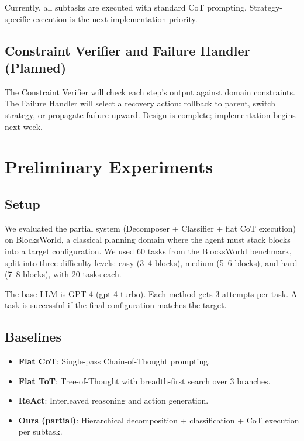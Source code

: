 \documentclass{article}
\begin{document}
Currently, all subtasks are executed with standard CoT prompting. Strategy-specific execution is the next implementation priority.

\subsection{Constraint Verifier and Failure Handler (Planned)}

The Constraint Verifier will check each step's output against domain constraints. The Failure Handler will select a recovery action: rollback to parent, switch strategy, or propagate failure upward. Design is complete; implementation begins next week.

\section{Preliminary Experiments}

\subsection{Setup}

We evaluated the partial system (Decomposer + Classifier + flat CoT execution) on BlocksWorld, a classical planning domain where the agent must stack blocks into a target configuration. We used 60 tasks from the BlocksWorld benchmark, split into three difficulty levels: easy (3--4 blocks), medium (5--6 blocks), and hard (7--8 blocks), with 20 tasks each.

The base LLM is GPT-4 (gpt-4-turbo). Each method gets 3 attempts per task. A task is successful if the final configuration matches the target.

\subsection{Baselines}

\begin{itemize}
    \item \textbf{Flat CoT}: Single-pass Chain-of-Thought prompting.
    \item \textbf{Flat ToT}: Tree-of-Thought with breadth-first search over 3 branches.
    \item \textbf{ReAct}: Interleaved reasoning and action generation.
    \item \textbf{Ours (partial)}: Hierarchical decomposition + classification + CoT execution per subtask.
\end{itemize}
\end{document}
